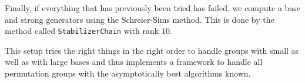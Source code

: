 Finally, if everything that has previously been tried has failed, we
compute a base and strong generators using the Schreier-Sims method. This
is done by the method called \texttt{StabilizerChain} with rank $10$.

This setup tries the right things in the right order to handle groups
with small as well as with large bases and thus implements a framework to
handle all permutation groups with the asymptotically best algorithms
known.


